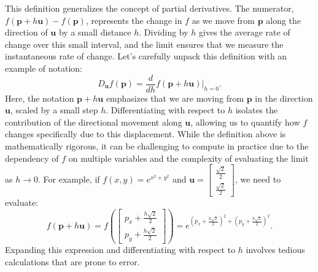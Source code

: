 \noindent This definition generalizes the concept of partial derivatives. The numerator, \( f(\mathbf{p} + h \mathbf{u}) - f(\mathbf{p}) \), represents the change in \( f \) as we move from \( \mathbf{p} \) along the direction of \( \mathbf{u} \) by a small distance \( h \). Dividing by \( h \) gives the average rate of change over this small interval, and the limit ensures that we measure the instantaneous rate of change. Let's carefully unpack this definition with an example of notation:
\[
D_{\mathbf{u}} f(\mathbf{p}) = \frac{d}{dh} f(\mathbf{p} + h \mathbf{u}) \bigg|_{h=0}.
\]
Here, the notation \( \mathbf{p} + h \mathbf{u} \) emphasizes that we are moving from \( \mathbf{p} \) in the direction \( \mathbf{u} \), scaled by a small step \( h \). Differentiating with respect to \( h \) isolates the contribution of the directional movement along \( \mathbf{u} \), allowing us to quantify how \( f \) changes specifically due to this displacement. While the definition above is mathematically rigorous, it can be challenging to compute in practice due to the dependency of \( f \) on multiple variables and the complexity of evaluating the limit as \( h \to 0 \). For example, if \( f(x, y) = e^{x^2 + y^2} \) and \( \mathbf{u} = \begin{bmatrix} \frac{\sqrt{2}}{2} \\ \frac{\sqrt{2}}{2} \end{bmatrix} \), we need to evaluate:
\[
f(\mathbf{p} + h \mathbf{u}) = f\left(\begin{bmatrix} p_x + \frac{h \sqrt{2}}{2} \\ p_y + \frac{h \sqrt{2}}{2} \end{bmatrix}\right) = e^{\left(p_x + \frac{h \sqrt{2}}{2}\right)^2 + \left(p_y + \frac{h \sqrt{2}}{2}\right)^2}.
\]
Expanding this expression and differentiating with respect to \( h \) involves tedious calculations that are prone to error.


